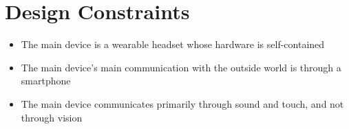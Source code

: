 \section{Design Constraints}
\begin{itemize}
\item The main device is a wearable headset whose hardware is self-contained
\item The main device's main communication with the outside world is through a smartphone
\item The main device communicates primarily through sound and touch, and not through vision
\end{itemize}
